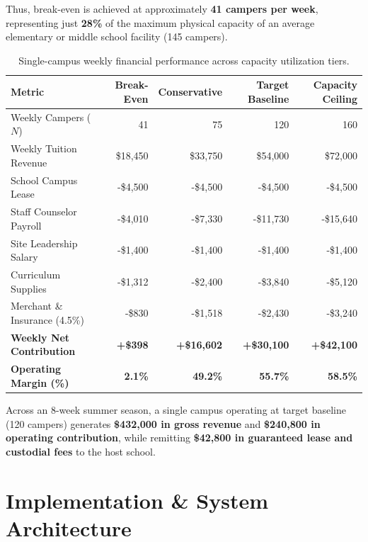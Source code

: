 \documentclass[11pt,a4paper]{article}
\begin{document}
Thus, break-even is achieved at approximately \textbf{41 campers per week}, representing just \textbf{28\%} of the maximum physical capacity of an average elementary or middle school facility (145 campers).

\begin{table}[h!]
\centering
\small
\begin{tabularx}{\textwidth}{lrrrr}
\toprule
\textbf{Metric} & \textbf{Break-Even} & \textbf{Conservative} & \textbf{Target Baseline} & \textbf{Capacity Ceiling} \\
\midrule
Weekly Campers ($N$) & 41 & 75 & 120 & 160 \\
Weekly Tuition Revenue & \$18,450 & \$33,750 & \$54,000 & \$72,000 \\
School Campus Lease & -\$4,500 & -\$4,500 & -\$4,500 & -\$4,500 \\
Staff Counselor Payroll & -\$4,010 & -\$7,330 & -\$11,730 & -\$15,640 \\
Site Leadership Salary & -\$1,400 & -\$1,400 & -\$1,400 & -\$1,400 \\
Curriculum Supplies & -\$1,312 & -\$2,400 & -\$3,840 & -\$5,120 \\
Merchant \& Insurance (4.5\%) & -\$830 & -\$1,518 & -\$2,430 & -\$3,240 \\
\midrule
\textbf{Weekly Net Contribution} & \textbf{+\$398} & \textbf{+\$16,602} & \textbf{+\$30,100} & \textbf{+\$42,100} \\
\textbf{Operating Margin (\%)} & \textbf{2.1\%} & \textbf{49.2\%} & \textbf{55.7\%} & \textbf{58.5\%} \\
\bottomrule
\end{tabularx}
\caption{Single-campus weekly financial performance across capacity utilization tiers.}
\label{tab:financials}
\end{table}

Across an 8-week summer season, a single campus operating at target baseline (120 campers) generates \textbf{\$432,000 in gross revenue} and \textbf{\$240,800 in operating contribution}, while remitting \textbf{\$42,800 in guaranteed lease and custodial fees} to the host school.

\section{Implementation \& System Architecture}
\end{document}
